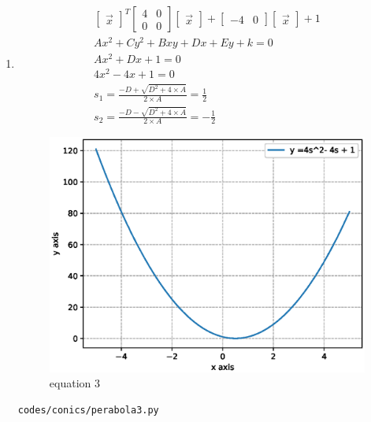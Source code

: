 \begin{enumerate}[label=\arabic*.,ref=\thesubsection.\theenumi]
\item
\begin{align}
\begin{bmatrix}\vec x\end{bmatrix}^T\begin{bmatrix}4 & 0\\0 & 0\end{bmatrix}\begin{bmatrix}\vec x\end{bmatrix} + \begin{bmatrix}-4 & 0\end{bmatrix}\begin{bmatrix}\vec x\end{bmatrix} +1
\\
Ax^2+Cy^2+Bxy+Dx+Ey+k =0
\\
Ax^2+Dx + 1 = 0
\\
4x^2-4x+1 = 0
\\
s_1 =  \frac{-D + \sqrt{D^2 + 4\times A }}{2\times A} = \frac{1}{2}
\\
s_2 =  \frac{-D - \sqrt{D^2 +4\times A }}{2\times A} = -\frac{1}{2}
\end{align}
\begin{figure}[!ht]
	\centering
	\includegraphics[width=\columnwidth]{./figures/conics/perabola3.eps}
	\caption{equation 3 }
	\label{fig:perabola3}
\end{figure}
\begin{lstlisting}
codes/conics/perabola3.py
\end{lstlisting}


\end{enumerate}
